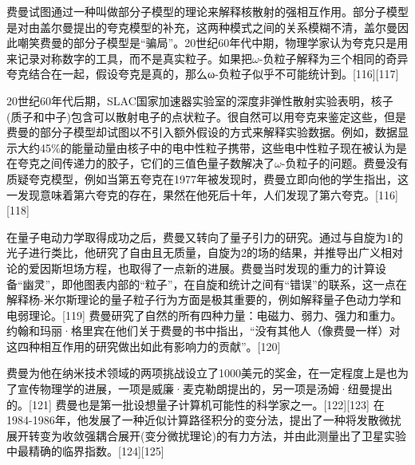 费曼试图通过一种叫做部分子模型的理论来解释核散射的强相互作用。部分子模型是对由盖尔曼提出的夸克模型的补充，这两种模式之间的关系模糊不清，盖尔曼因此嘲笑费曼的部分子模型是“骗局”。20世纪60年代中期，物理学家认为夸克只是用来记录对称数字的工具，而不是真实粒子。如果把$\omega$-负粒子解释为三个相同的奇异夸克结合在一起，假设夸克是真的，那么ω-负粒子似乎不可能统计到。[116][117]

20世纪60年代后期，SLAC国家加速器实验室的深度非弹性散射实验表明，核子(质子和中子)包含可以散射电子的点状粒子。很自然可以用夸克来鉴定这些，但是费曼的部分子模型却试图以不引入额外假设的方式来解释实验数据。例如，数据显示大约45\%的能量动量由核子中的电中性粒子携带，这些电中性粒子现在被认为是在夸克之间传递力的胶子，它们的三值色量子数解决了$\omega$-负粒子的问题。费曼没有质疑夸克模型，例如当第五夸克在1977年被发现时，费曼立即向他的学生指出，这一发现意味着第六夸克的存在，果然在他死后十年，人们发现了第六夸克。[116][118]

在量子电动力学取得成功之后，费曼又转向了量子引力的研究。通过与自旋为1的光子进行类比，他研究了自由且无质量，自旋为2的场的结果，并推导出广义相对论的爱因斯坦场方程，也取得了一点新的进展。费曼当时发现的重力的计算设备“幽灵”，即他图表内部的“粒子”，在自旋和统计之间有“错误”的联系，这一点在解释杨-米尔斯理论的量子粒子行为方面是极其重要的，例如解释量子色动力学和电弱理论。[119] 费曼研究了自然的所有四种力量：电磁力、弱力、强力和重力。约翰和玛丽·格里宾在他们关于费曼的书中指出，“没有其他人（像费曼一样）对这四种相互作用的研究做出如此有影响力的贡献”。[120]

费曼为他在纳米技术领域的两项挑战设立了1000美元的奖金，在一定程度上是也为了宣传物理学的进展，一项是威廉·麦克勒朗提出的，另一项是汤姆·纽曼提出的。[121] 费曼也是第一批设想量子计算机可能性的科学家之一。[122][123] 在1984-1986年，他发展了一种近似计算路径积分的变分法，提出了一种将发散微扰展开转变为收敛强耦合展开(变分微扰理论)的有力方法，并由此测量出了卫星实验中最精确的临界指数。[124][125]